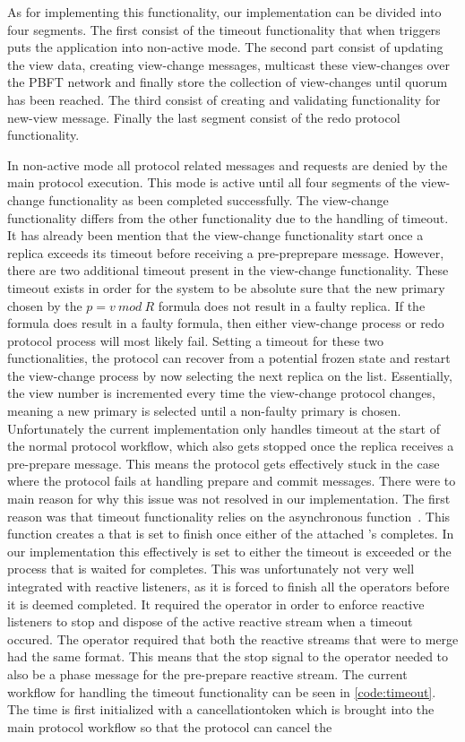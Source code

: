 As for implementing this functionality, our implementation can be divided into four segments. The first consist of the timeout functionality that when triggers puts the application into non-active mode. The second part consist of updating the view data, creating view-change messages, multicast these view-changes over the PBFT network and finally store the collection of view-changes until quorum has been reached. The third consist of creating and validating functionality for new-view message. Finally the last segment consist of the redo protocol functionality. 

In non-active mode all protocol related messages and requests are denied by the main protocol execution. This mode is active until all four segments of the view-change functionality as been completed successfully. The view-change functionality differs from the other functionality due to the handling of timeout. It has already been mention that the view-change functionality start once a replica exceeds its timeout before receiving a pre-preprepare message. However, there are two additional timeout present in the view-change functionality. These timeout exists in order for the system to be absolute sure that the new primary chosen by the $p = v ~mod~ R$ formula does not result in a faulty replica. If the formula does result in a faulty formula, then either view-change process or redo protocol process will most likely fail. Setting a timeout for these two functionalities, the protocol can recover from a potential frozen state and restart the view-change process by now selecting the next replica on the list. Essentially, the view number is incremented every time the view-change protocol changes, meaning a new primary is selected until a non-faulty primary is chosen. Unfortunately the current implementation only handles timeout at the start of the normal protocol workflow, which also gets stopped once the replica receives a pre-prepare message. This means the protocol gets effectively stuck in the case where the protocol fails at handling prepare and commit messages. There were to main reason for why this issue was not resolved in our implementation. The first reason was that timeout functionality relies on the  asynchronous function~\cite{WEB:whenany}. This function creates a  that is set to finish once either of the attached 's completes. In our implementation this effectively is set to either the timeout is exceeded or the process that is waited for completes. This was unfortunately not very well integrated with reactive listeners, as it is forced to finish all the operators before it is deemed completed. It required the  operator in order to enforce reactive listeners to stop and dispose of the active reactive stream when a timeout occured. The  operator required that both the reactive streams that were to merge had the same format. This means that the stop signal to the  operator needed to also be a phase message for the pre-prepare reactive stream. The current workflow for handling the timeout functionality can be seen in \autoref{code:timeout}. The time is first initialized with a cancellationtoken which is brought into the main protocol workflow so that the protocol can cancel the 